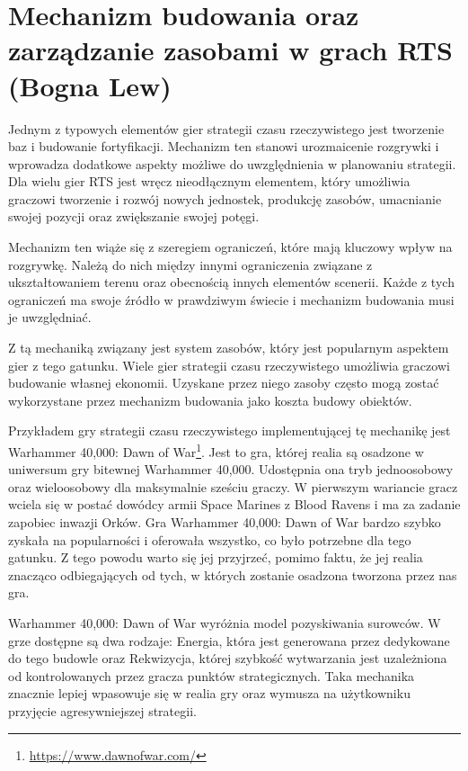 \section{Mechanizm budowania oraz zarządzanie zasobami w grach RTS (Bogna Lew)}\label{s:budowanie}
Jednym z typowych elementów gier strategii czasu rzeczywistego  jest tworzenie baz i budowanie fortyfikacji. Mechanizm
ten stanowi urozmaicenie rozgrywki i wprowadza dodatkowe aspekty możliwe do uwzględnienia w planowaniu strategii. Dla
wielu gier RTS jest wręcz nieodłącznym elementem, który umożliwia graczowi tworzenie i rozwój nowych jednostek,
produkcję zasobów, umacnianie swojej pozycji oraz zwiększanie swojej potęgi.

Mechanizm ten wiąże się z szeregiem ograniczeń, które mają kluczowy wpływ na rozgrywkę. Należą do nich między innymi
ograniczenia związane z ukształtowaniem terenu oraz obecnością innych elementów scenerii. Każde z tych ograniczeń ma
swoje źródło w prawdziwym świecie i mechanizm budowania musi je uwzględniać.

Z tą mechaniką związany jest system zasobów, który jest popularnym aspektem gier z tego gatunku. Wiele gier strategii
czasu rzeczywistego umożliwia graczowi budowanie własnej ekonomii. Uzyskane przez niego zasoby często mogą zostać
wykorzystane przez mechanizm budowania jako koszta budowy obiektów.

Przykładem gry strategii czasu rzeczywistego implementującej tę mechanikę jest Warhammer 40,000: Dawn of War\footnote{\url{https://www.dawnofwar.com/}}. Jest to
gra, której realia są osadzone w uniwersum gry bitewnej Warhammer 40,000. Udostępnia ona tryb jednoosobowy oraz
wieloosobowy dla maksymalnie sześciu graczy. W pierwszym wariancie gracz wciela się w postać dowódcy
armii Space Marines z Blood Ravens i ma za zadanie zapobiec inwazji Orków. Gra Warhammer 40,000: Dawn of War bardzo szybko
zyskała na popularności i oferowała wszystko, co było potrzebne dla tego gatunku. Z tego powodu warto się jej przyjrzeć,
pomimo faktu, że jej realia znacząco odbiegających od tych, w których zostanie osadzona tworzona przez nas gra.

Warhammer 40,000: Dawn of War wyróżnia model pozyskiwania surowców. W grze dostępne są dwa rodzaje: Energia, która jest
generowana przez dedykowane do tego budowle oraz Rekwizycja, której szybkość wytwarzania jest uzależniona od kontrolowanych
przez gracza punktów strategicznych. Taka mechanika znacznie lepiej wpasowuje się w realia gry oraz wymusza na użytkowniku
przyjęcie agresywniejszej strategii.

